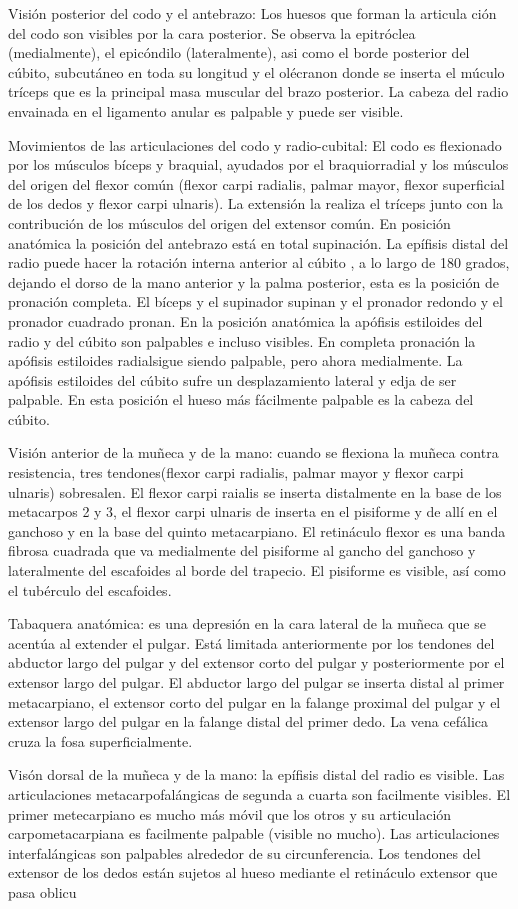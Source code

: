 Visión posterior del codo y el antebrazo: Los huesos que forman la articula ción del codo son visibles por la cara posterior. Se observa la epitróclea (medialmente), el epicóndilo (lateralmente), asi como el borde posterior del cúbito, subcutáneo en toda su longitud y el olécranon donde se inserta el múculo tríceps que es la principal masa muscular del brazo posterior. La cabeza del radio envainada en el ligamento anular es palpable y puede ser visible.

Movimientos de las articulaciones del codo y radio-cubital: El codo es flexionado por los músculos bíceps y braquial, ayudados por el braquiorradial y los músculos del origen del flexor común (flexor carpi radialis, palmar mayor, flexor superficial de los dedos y flexor carpi ulnaris). La extensión la realiza el tríceps junto con la contribución de los músculos del origen del extensor común.
En posición anatómica la posición del antebrazo está en total supinación. La epífisis distal del radio puede hacer la rotación interna anterior al cúbito , a lo largo de 180 grados, dejando el dorso de la mano anterior y la palma posterior, esta es la posición de pronación completa. El bíceps y el supinador supinan y el pronador redondo y el pronador cuadrado pronan.
En la posición anatómica la apófisis estiloides del radio y del cúbito son palpables e incluso visibles. En completa pronación la apófisis estiloides radialsigue siendo palpable, pero ahora medialmente. La apófisis estiloides del cúbito sufre un desplazamiento lateral y edja de ser palpable. En esta posición el hueso más fácilmente palpable es la cabeza del cúbito.

Visión anterior de la muñeca y de la mano: cuando se flexiona la muñeca contra resistencia, tres tendones(flexor carpi radialis, palmar mayor y flexor carpi ulnaris) sobresalen. El flexor carpi raialis se inserta distalmente en la base de los metacarpos 2 y 3, el flexor carpi ulnaris de inserta en el pisiforme y de allí en el ganchoso y en la base del quinto metacarpiano.
El retináculo flexor es una banda fibrosa cuadrada que va medialmente del pisiforme al gancho del ganchoso y lateralmente del escafoides al borde del trapecio. El pisiforme es visible, así como el tubérculo del escafoides.

Tabaquera anatómica: es una depresión en la cara lateral de la muñeca que se acentúa al extender el pulgar. Está limitada anteriormente por los tendones del abductor largo del pulgar y del extensor corto del pulgar y posteriormente por el extensor largo del pulgar. 
El abductor largo del pulgar se inserta distal al primer metacarpiano, el extensor corto del pulgar en la falange proximal del pulgar y el extensor largo del pulgar en la falange distal del primer dedo. La vena cefálica cruza la fosa superficialmente.

Visón dorsal de la muñeca y de la mano: la epífisis distal del radio es visible. Las articulaciones metacarpofalángicas de segunda a cuarta son facilmente visibles. El primer metecarpiano es mucho más móvil que los otros y su articulación carpometacarpiana es facilmente palpable (visible no mucho). Las articulaciones interfalángicas son palpables alrededor de su circunferencia.
Los tendones del extensor de los dedos están sujetos al hueso mediante el retináculo extensor que pasa oblicu